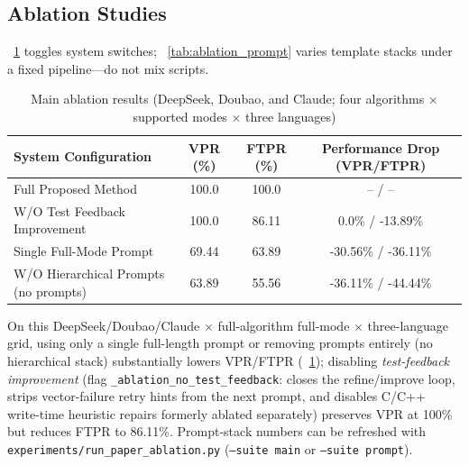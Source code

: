 \documentclass[12pt]{llncs}
\begin{document}
\subsection{Ablation Studies}
\tablename~\ref{tab:ablation_main} toggles system switches; \tablename~\ref{tab:ablation_prompt} varies template stacks under a fixed pipeline---do not mix scripts.

\begin{table}[H]
  \centering
  \footnotesize
  \caption{Main ablation results (DeepSeek, Doubao, and Claude; four algorithms $\times$ supported modes $\times$ three languages)}
  \label{tab:ablation_main}
  \setlength{\tabcolsep}{4pt}
  \begin{tabular}{l c c c}
    \toprule
    System Configuration                  & VPR (\%) & FTPR (\%) & Performance Drop (VPR/FTPR) \\
    \midrule
    Full Proposed Method                  & 100.0    & 100.0     & -- / --                     \\
    W/O Test Feedback Improvement         & 100.0    & 86.11     & 0.0\% / -13.89\%            \\
    Single Full-Mode Prompt               & 69.44    & 63.89     & -30.56\% / -36.11\%         \\
    W/O Hierarchical Prompts (no prompts) & 63.89    & 55.56     & -36.11\% / -44.44\%         \\
    \bottomrule
  \end{tabular}
\end{table}

On this DeepSeek/Doubao/Claude $\times$ full-algorithm full-mode $\times$ three-language grid, using only a single full-length prompt or removing prompts entirely (no hierarchical stack) substantially lowers VPR/FTPR (\tablename~\ref{tab:ablation_main}); disabling \emph{test-feedback improvement} (flag \texttt{\_ablation\_no\_test\_feedback}: closes the refine/improve loop, strips vector-failure retry hints from the next prompt, and disables C/C++ write-time heuristic repairs formerly ablated separately) preserves VPR at 100\% but reduces FTPR to 86.11\%. Prompt-stack numbers can be refreshed with \texttt{experiments/run\_paper\_ablation.py} (\texttt{--suite main} or \texttt{--suite prompt}).
\end{document}
